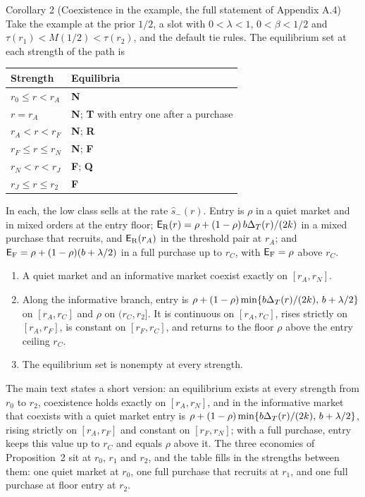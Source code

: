 \begin{paperresult}{Corollary 2 (Coexistence in the example, the full statement of Appendix A.4)}
Take the example at the prior \(1/2\), a slot with \(0<\lambda<1\), \(0<\beta<1/2\) and \(\tau(r_1)<M(1/2)<\tau(r_2)\),
and the default tie rules. The equilibrium set at each strength of the path is
\begin{center}\upshape
\begin{tabular}{@{}ll@{}}
\toprule
Strength & Equilibria\\
\midrule
\(r_0\le r<r_A\) & \textbf{N}\\
\(r=r_A\) & \textbf{N}; \textbf{T} with entry one after a purchase\\
\(r_A<r<r_F\) & \textbf{N}; \textbf{R}\\
\(r_F\le r\le r_N\) & \textbf{N}; \textbf{F}\\
\(r_N<r<r_J\) & \textbf{F}; \textbf{Q}\\
\(r_J\le r\le r_2\) & \textbf{F}\\
\bottomrule
\end{tabular}
\end{center}
In each, the low class sells at the rate \(\hat s_-(r)\). Entry is \(\rho\) in a quiet market and in mixed orders at
the entry floor; \(\mathsf{E}_{\rm R}(r)=\rho+(1-\rho)\,b\Delta_T(r)/(2k)\) in a mixed purchase that recruits, and
\(\mathsf{E}_{\rm R}(r_A)\) in the threshold pair at \(r_A\); and \(\mathsf{E}_{\rm F}=\rho+(1-\rho)(b+\lambda/2)\) in a full
purchase up to \(r_C\), with \(\mathsf{E}_{\rm F}=\rho\) above \(r_C\).
\begin{enumerate}[label=(\alph*),leftmargin=2em]
\item A quiet market and an informative market coexist exactly on \([r_A,r_N]\).
\item Along the informative branch, entry is \(\rho+(1-\rho)\min\{b\Delta_T(r)/(2k),\,b+\lambda/2\}\) on \([r_A,r_C]\) and
\(\rho\) on \((r_C,r_2]\). It is continuous on \([r_A,r_C]\), rises strictly on \([r_A,r_F]\), is constant on
\([r_F,r_C]\), and returns to the floor \(\rho\) above the entry ceiling \(r_C\).
\item The equilibrium set is nonempty at every strength.
\end{enumerate}
\end{paperresult}

The main text states a short version: an equilibrium exists at every strength from \(r_0\) to \(r_2\), coexistence
holds exactly on \([r_A,r_N]\), and in the informative market that coexists with a quiet market entry is
\(\rho+(1-\rho)\min\{b\Delta_T(r)/(2k),\,b+\lambda/2\}\), rising strictly on \([r_A,r_F]\) and constant on \([r_F,r_N]\);
with a full purchase, entry keeps this value up to \(r_C\) and equals \(\rho\) above it. The three economies of
Proposition~2 sit at \(r_0\), \(r_1\) and \(r_2\), and the table fills in the strengths between them: one quiet market
at \(r_0\), one full purchase that recruits at \(r_1\), and one full purchase at floor entry at \(r_2\).

